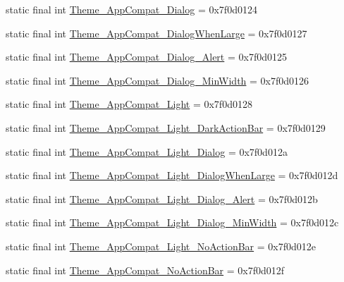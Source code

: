 \begin{DoxyCompactItemize}
static final int \mbox{\hyperlink{classandroid_1_1support_1_1design_1_1R_1_1style_a68e5f0f49f3cbc58cb530e3977ba8d85}{Theme\+\_\+\+App\+Compat\+\_\+\+Dialog}} = 0x7f0d0124
\item 
static final int \mbox{\hyperlink{classandroid_1_1support_1_1design_1_1R_1_1style_a53b0b06f59f50b329442743a580079d5}{Theme\+\_\+\+App\+Compat\+\_\+\+Dialog\+When\+Large}} = 0x7f0d0127
\item 
static final int \mbox{\hyperlink{classandroid_1_1support_1_1design_1_1R_1_1style_ad919dfbf7c746414e586fcc4092892ec}{Theme\+\_\+\+App\+Compat\+\_\+\+Dialog\+\_\+\+Alert}} = 0x7f0d0125
\item 
static final int \mbox{\hyperlink{classandroid_1_1support_1_1design_1_1R_1_1style_a8340a15f587d3800614ee46322218e0d}{Theme\+\_\+\+App\+Compat\+\_\+\+Dialog\+\_\+\+Min\+Width}} = 0x7f0d0126
\item 
static final int \mbox{\hyperlink{classandroid_1_1support_1_1design_1_1R_1_1style_a919e23b493f57ba6c89a203538a1f629}{Theme\+\_\+\+App\+Compat\+\_\+\+Light}} = 0x7f0d0128
\item 
static final int \mbox{\hyperlink{classandroid_1_1support_1_1design_1_1R_1_1style_a49d9a5053b6943cad2ad50d5d9d27e6c}{Theme\+\_\+\+App\+Compat\+\_\+\+Light\+\_\+\+Dark\+Action\+Bar}} = 0x7f0d0129
\item 
static final int \mbox{\hyperlink{classandroid_1_1support_1_1design_1_1R_1_1style_a9c51a1db3bd57fcb2ed882ed1dd85829}{Theme\+\_\+\+App\+Compat\+\_\+\+Light\+\_\+\+Dialog}} = 0x7f0d012a
\item 
static final int \mbox{\hyperlink{classandroid_1_1support_1_1design_1_1R_1_1style_ad18470224513598002203a19f9e9afb2}{Theme\+\_\+\+App\+Compat\+\_\+\+Light\+\_\+\+Dialog\+When\+Large}} = 0x7f0d012d
\item 
static final int \mbox{\hyperlink{classandroid_1_1support_1_1design_1_1R_1_1style_a38330218cb951a3bf1e25e103383efb9}{Theme\+\_\+\+App\+Compat\+\_\+\+Light\+\_\+\+Dialog\+\_\+\+Alert}} = 0x7f0d012b
\item 
static final int \mbox{\hyperlink{classandroid_1_1support_1_1design_1_1R_1_1style_af2fcec3a17d1266c1aa09404150083c0}{Theme\+\_\+\+App\+Compat\+\_\+\+Light\+\_\+\+Dialog\+\_\+\+Min\+Width}} = 0x7f0d012c
\item 
static final int \mbox{\hyperlink{classandroid_1_1support_1_1design_1_1R_1_1style_add69b6a7a05e046750100674904246de}{Theme\+\_\+\+App\+Compat\+\_\+\+Light\+\_\+\+No\+Action\+Bar}} = 0x7f0d012e
\item 
static final int \mbox{\hyperlink{classandroid_1_1support_1_1design_1_1R_1_1style_a908dbe9e5db2dcaaa875b2b3076e6986}{Theme\+\_\+\+App\+Compat\+\_\+\+No\+Action\+Bar}} = 0x7f0d012f

\end{DoxyCompactItemize}
